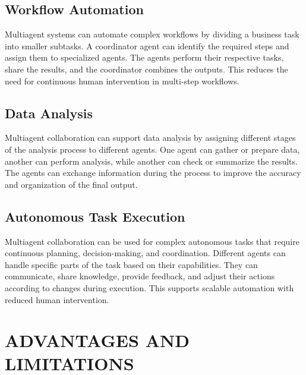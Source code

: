 \documentclass[12pt,a4paper]{report}
\begin{document}
\section{Workflow Automation}
Multiagent systems can automate complex workflows by dividing a business task into smaller subtasks. A coordinator agent can identify the required steps and assign them to specialized agents. The agents perform their respective tasks, share the results, and the coordinator combines the outputs. This reduces the need for continuous human intervention in multi-step workflows.

\section{Data Analysis}
Multiagent collaboration can support data analysis by assigning different stages of the analysis process to different agents. One agent can gather or prepare data, another can perform analysis, while another can check or summarize the results. The agents can exchange information during the process to improve the accuracy and organization of the final output.

\section{Autonomous Task Execution}
Multiagent collaboration can be used for complex autonomous tasks that require continuous planning, decision-making, and coordination. Different agents can handle specific parts of the task based on their capabilities. They can communicate, share knowledge, provide feedback, and adjust their actions according to changes during execution. This supports scalable automation with reduced human intervention.

\chapter{ADVANTAGES AND LIMITATIONS}
\end{document}
